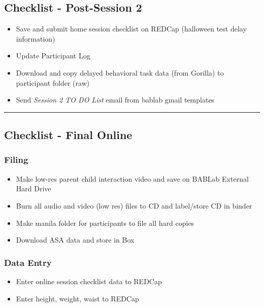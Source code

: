 \documentclass[]{book}
\providecommand{\tightlist}{%
  \setlength{\itemsep}{0pt}\setlength{\parskip}{0pt}}
\begin{document}
\hypertarget{checklist---post-session-2-2}{%
\subsection{Checklist - Post-Session 2}\label{checklist---post-session-2-2}}

\begin{itemize}
\tightlist
\item
  Save and submit home session checklist on REDCap (halloween test delay information)
\item
  Update Participant Log
\item
  Download and copy delayed behavioral task data (from Gorilla) to participant folder (raw)
\item
  Send \emph{Session 2 TO DO List} email from bablab gmail templates
\end{itemize}

\begin{center}\rule{0.5\linewidth}{0.5pt}\end{center}

\hypertarget{checklist---final-online-2}{%
\subsection{Checklist - Final Online}\label{checklist---final-online-2}}

\hypertarget{filing-9}{%
\subsubsection{Filing}\label{filing-9}}

\begin{itemize}
\tightlist
\item
  Make low-res parent child interaction video and save on BABLab External Hard Drive
\item
  Burn all audio and video (low res) files to CD and label/store CD in binder
\item
  Make manila folder for participants to file all hard copies
\item
  Download ASA data and store in Box
\end{itemize}

\hypertarget{data-entry-6}{%
\subsubsection{Data Entry}\label{data-entry-6}}

\begin{itemize}
\tightlist
\item
  Enter online session checklist data to REDCap
\item
  Enter height, weight, waist to REDCap
\end{itemize}
\end{document}
